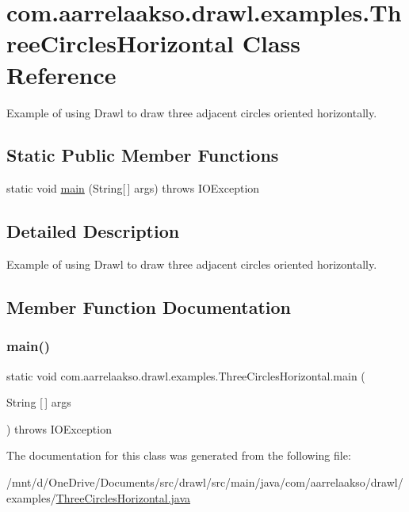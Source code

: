 \hypertarget{classcom_1_1aarrelaakso_1_1drawl_1_1examples_1_1_three_circles_horizontal}{}\section{com.\+aarrelaakso.\+drawl.\+examples.\+Three\+Circles\+Horizontal Class Reference}
\label{classcom_1_1aarrelaakso_1_1drawl_1_1examples_1_1_three_circles_horizontal}


Example of using Drawl to draw three adjacent circles oriented horizontally.  


\subsection*{Static Public Member Functions}
\begin{DoxyCompactItemize}
\item 
static void \hyperlink{classcom_1_1aarrelaakso_1_1drawl_1_1examples_1_1_three_circles_horizontal_aa085f6eaaa0a026e69fe1753916afa5e}{main} (String\mbox{[}$\,$\mbox{]} args)  throws I\+O\+Exception 
\end{DoxyCompactItemize}


\subsection{Detailed Description}
Example of using Drawl to draw three adjacent circles oriented horizontally. 

\subsection{Member Function Documentation}
\mbox{\label{classcom_1_1aarrelaakso_1_1drawl_1_1examples_1_1_three_circles_horizontal_aa085f6eaaa0a026e69fe1753916afa5e}} 
\subsubsection{\texorpdfstring{main()}{main()}}
{\footnotesize\ttfamily static void com.\+aarrelaakso.\+drawl.\+examples.\+Three\+Circles\+Horizontal.\+main (\begin{DoxyParamCaption}\item[{String \mbox{[}$\,$\mbox{]}}]{args }\end{DoxyParamCaption}) throws I\+O\+Exception\hspace{0.3cm}{\ttfamily [static]}}



The documentation for this class was generated from the following file\+:\begin{DoxyCompactItemize}
\item 
/mnt/d/\+One\+Drive/\+Documents/src/drawl/src/main/java/com/aarrelaakso/drawl/examples/\hyperlink{_three_circles_horizontal_8java}{Three\+Circles\+Horizontal.\+java}\end{DoxyCompactItemize}
